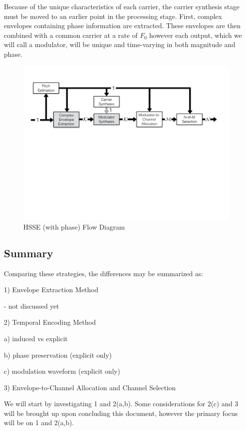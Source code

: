 \documentclass [11pt, proquest,oneside] {ganter_thesis}[2015/03/03]
\begin{document}
Because of the unique characteristics of each carrier, the carrier synthesis stage must be moved to an earlier point in the processing stage.  First, complex envelopes containing phase information are extracted.  These envelopes are then combined with a common carrier at a rate of $F_0$ however each output, which we will call a modulator, will be unique and time-varying in both magnitude and phase.

\begin{figure}[!ht]
  \centering
    \includegraphics[width=1\textwidth]{HSSE_flow_diagram_Phase}   
    \caption{HSSE (with phase) Flow Diagram}
\end{figure}

\subsection{Summary}

Comparing these strategies, the differences may be summarized as:

1) Envelope Extraction Method

- not discussed yet

2) Temporal Encoding Method

a) induced vs explicit

b) phase preservation (explicit only)

c) modulation waveform (explicit only)

3) Envelope-to-Channel Allocation and Channel Selection

We will start by investigating 1 and 2(a,b).  Some considerations for 2(c) and 3 will be brought up upon concluding this document, however the primary focus will be on 1 and 2(a,b).
\end{document}
